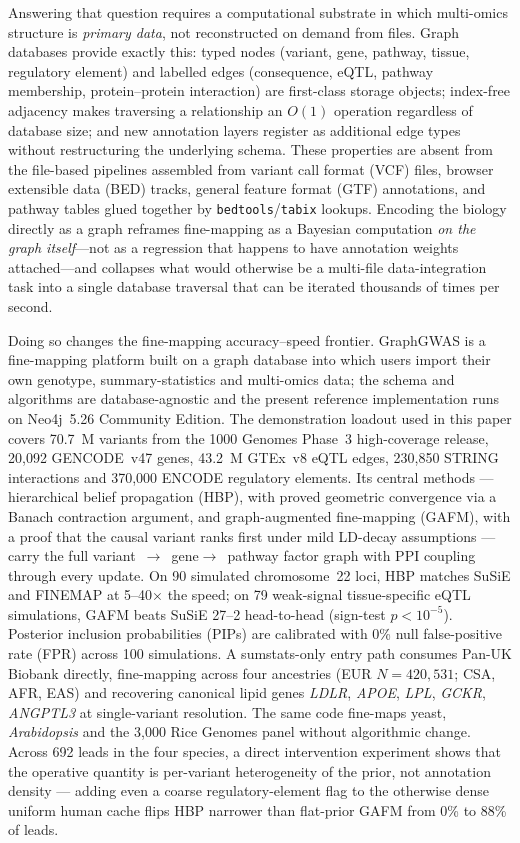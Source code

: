 Answering that question requires a computational substrate in which
multi-omics structure is \emph{primary data}, not reconstructed on
demand from files. Graph databases provide exactly
this\cite{robinson2015graph}: typed nodes (variant, gene, pathway,
tissue, regulatory element) and labelled edges (consequence, eQTL,
pathway membership, protein--protein interaction) are first-class
storage objects; index-free adjacency makes traversing a
relationship an $O(1)$ operation regardless of database size; and
new annotation layers register as additional edge types without
restructuring the underlying schema. These properties are absent
from the file-based pipelines assembled from variant call format
(VCF) files, browser extensible data (BED) tracks, general feature
format (GTF) annotations, and pathway tables glued together by
\texttt{bedtools}/\texttt{tabix} lookups. Encoding the biology
directly as a graph reframes fine-mapping as a Bayesian computation
\emph{on the graph itself}---not as a regression that happens to
have annotation weights attached---and collapses what would
otherwise be a multi-file data-integration task into a single
database traversal that can be iterated thousands of times per
second.

Doing so changes the fine-mapping
accuracy--speed frontier. GraphGWAS is a fine-mapping platform built
on a graph database\cite{robinson2015graph} into which users import
their own genotype, summary-statistics and multi-omics data; the
schema and algorithms are database-agnostic and the present
reference implementation runs on Neo4j~5.26 Community Edition. The
demonstration loadout used in this paper covers 70.7~M variants from
the 1000 Genomes Phase~3 high-coverage release, 20{,}092 GENCODE~v47
genes\cite{frankish2023gencode}, 43.2~M GTEx~v8 eQTL edges,
230{,}850 STRING interactions and 370{,}000 ENCODE regulatory
elements. Its central methods ---
hierarchical belief propagation (HBP), with proved geometric
convergence via a Banach contraction argument, and graph-augmented
fine-mapping (GAFM), with a proof that the causal variant ranks
first under mild LD-decay assumptions --- carry the full
variant~$\rightarrow$~gene$\rightarrow$~pathway factor graph with
PPI coupling through every update. On 90 simulated chromosome~22
loci, HBP matches SuSiE and FINEMAP at 5--40$\times$ the speed; on
79 weak-signal tissue-specific eQTL simulations, GAFM beats SuSiE
27--2 head-to-head (sign-test $p < 10^{-5}$). Posterior inclusion
probabilities (PIPs) are calibrated with 0\% null false-positive
rate (FPR) across 100 simulations. A
sumstats-only entry path consumes Pan-UK Biobank\cite{karczewski2024pan}
directly, fine-mapping across four ancestries
(EUR $N{=}420{,}531$; CSA, AFR, EAS) and recovering canonical
lipid genes \emph{LDLR}, \emph{APOE}, \emph{LPL}, \emph{GCKR},
\emph{ANGPTL3} at single-variant resolution. The same code
fine-maps yeast\cite{peter2018genome},
\emph{Arabidopsis}\cite{alonso20161001} and the 3{,}000 Rice
Genomes panel without algorithmic change. Across 692 leads in
the four species, a direct intervention experiment shows that the
operative quantity is per-variant heterogeneity of the prior, not
annotation density --- adding even a coarse regulatory-element
flag to the otherwise dense uniform human cache flips HBP
narrower than flat-prior GAFM from 0\% to 88\% of leads.
